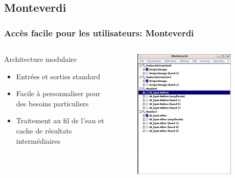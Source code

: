 \documentclass[compress,handout]{beamer}
\begin{document}
\subsection{Monteverdi}
\begin{frame}
\frametitle{Accès facile pour les utilisateurs: Monteverdi}
\begin{columns}
\begin{column}{0.5\textwidth}
\begin{block}{Architecture modulaire}
\scriptsize
\begin{itemize}
\item Entrées et sorties standard
\item Facile à personnaliser pour des besoins particuliers
\item Traitement au fil de l'eau et cache de résultats intermédiaires
\end{itemize}
\end{block}
\end{column}
\begin{column}{0.5\textwidth}
\begin{figure}[]
  \includegraphics[width=0.9\textwidth]{monteverdi1.jpg}
\end{figure}
\end{column}
\end{columns}
\end{frame}
\end{document}
